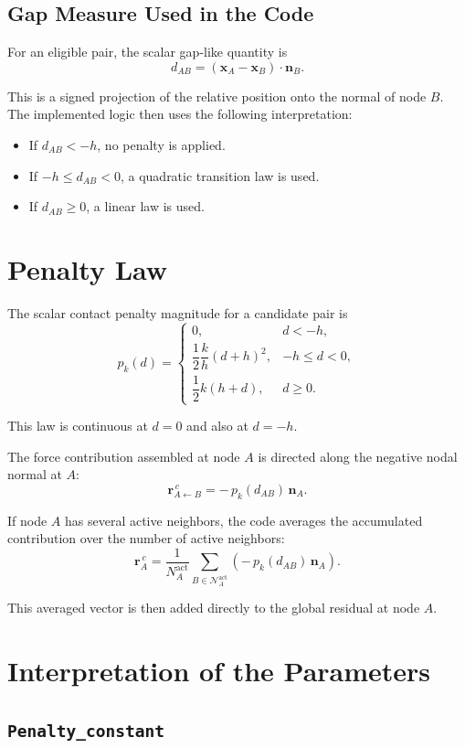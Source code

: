 \documentclass[11pt]{article}
\begin{document}
\subsection{Gap Measure Used in the Code}

For an eligible pair, the scalar gap-like quantity is
\[
d_{AB} = (\bm{x}_A - \bm{x}_B)\cdot \bm{n}_B.
\]

This is a signed projection of the relative position onto the normal of node $B$. The implemented logic then uses the following interpretation:
\begin{itemize}[leftmargin=*]
\item If $d_{AB} < -h$, no penalty is applied.
\item If $-h \le d_{AB} < 0$, a quadratic transition law is used.
\item If $d_{AB} \ge 0$, a linear law is used.
\end{itemize}

\section{Penalty Law}

The scalar contact penalty magnitude for a candidate pair is
\[
p_k(d) =
\begin{cases}
0, & d < -h, \\[6pt]
\dfrac{1}{2}\dfrac{k}{h}(d+h)^2, & -h \le d < 0, \\[10pt]
\dfrac{1}{2}k(h+d), & d \ge 0.
\end{cases}
\]

This law is continuous at $d=0$ and also at $d=-h$.

The force contribution assembled at node $A$ is directed along the negative nodal normal at $A$:
\[
\bm{r}^{\,c}_{A \leftarrow B} = -\,p_k(d_{AB})\,\bm{n}_A.
\]

If node $A$ has several active neighbors, the code averages the accumulated contribution over the number of active neighbors:
\[
\bm{r}^{\,c}_A =
\frac{1}{N_A^{\mathrm{act}}}
\sum_{B \in \mathcal{N}_A^{\mathrm{act}}}
\left(-\,p_k(d_{AB})\,\bm{n}_A\right).
\]

This averaged vector is then added directly to the global residual at node $A$.

\section{Interpretation of the Parameters}

\subsection{\texttt{Penalty\_constant}}
\end{document}
